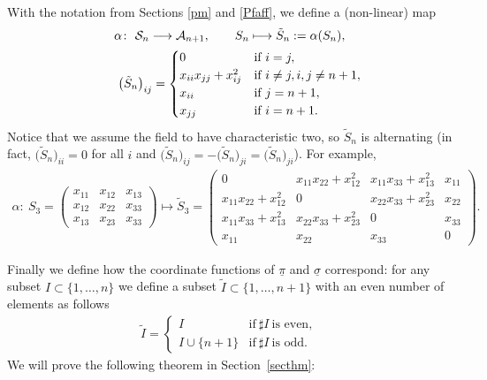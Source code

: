 \documentclass[pdftex]{sigma}
\newcommand{\cA}{{\cal A}}
\newcommand{\cS}{{\cal S}}
\newcommand{\tI}{{\tilde{I}}}
\newcommand{\tS}{{\tilde{S}}}
\numberwithin{equation}{section}
\begin{document}
With the notation from Sections \ref{pm} and \ref{Pfaff}, we define a (non-linear) map
\begin{gather*}
\alpha\colon \ \cS_n\longrightarrow \cA_{n+1},\qquad
S_n \longmapsto \tS_n:=\alpha(S_n),\\
\hphantom{\alpha\colon}{} \ \big(\tS_n\big)_{ij} =\begin{cases} 0 & \text{if }i=j,\\
 x_{ii}x_{jj}+x_{ij}^2 & \text{if } i \neq j, i,j\neq n+1,\\
 x_{ii} &\text{if }j=n+1,\\
 x_{jj} &\text{if }i=n+1.
 \end{cases}
\end{gather*}
Notice that we assume the field to have characteristic two, so $\tS_n$ is alternating (in fact, $\big(\tS_n\big)_{ii}=0$ for all $i$ and $\big(\tS_n\big)_{ij}=-\big(\tS_n\big)_{ji}=\big(\tS_n\big)_{ji}$).
For example,
\begin{gather*}
\alpha\colon \ S_3 =
\left(\begin{matrix} x_{11}&x_{12}&x_{13}\\
x_{12}&x_{22}&x_{33}\\
x_{13}&x_{23}&x_{33}
\end{matrix}\right)
\longmapsto \tS_3 =
\left(\begin{matrix} 0&x_{11}x_{22}+x_{12}^2&x_{11}x_{33}+x_{13}^2&x_{11}\\
x_{11}x_{22}+x_{12}^2&0& x_{22}x_{33}+x_{23}^2& x_{22}\\
x_{11}x_{33}+x_{13}^2& x_{22}x_{33}+x_{23}^2 &0&x_{33}\\
x_{11}&x_{22}&x_{33}&0
\end{matrix}\right).
\end{gather*}

Finally we define how the coordinate functions of $\underline{\pi}$ and $\underline{\sigma}$ correspond: for any subset $I\subset\{1,\ldots,n\}$ we define a subset $\tI\subset\{1,\ldots,n+1\}$ with an even number of elements as follows
\begin{gather*}
\tI = \begin{cases}
 I&\text{if} \ \sharp I \ \text{is even},\\
 I\cup\{n+1\}&\text{if} \ \sharp I \ \text{is odd}.
 \end{cases}
\end{gather*}
We will prove the following theorem in Section~\ref{secthm}:
\end{document}
